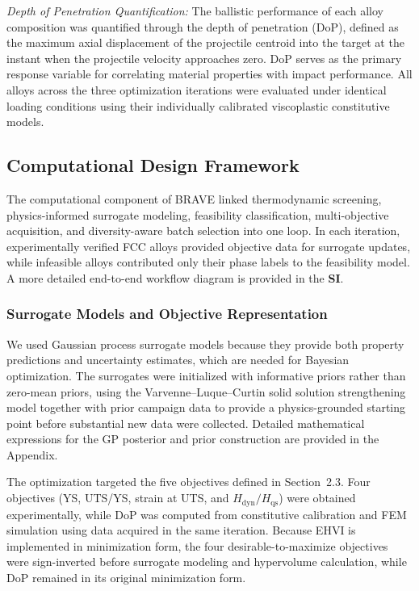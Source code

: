 \documentclass[preprint,12pt,times]{elsarticle}  %
\begin{document}
\emph{Depth of Penetration Quantification:} The ballistic performance of each alloy composition was quantified through the depth of penetration (DoP), defined as the maximum axial displacement of the projectile centroid into the target at the instant when the projectile velocity approaches zero. DoP serves as the primary response variable for correlating material properties with impact performance. All alloys across the three optimization iterations were evaluated under identical loading conditions using their individually calibrated viscoplastic constitutive models.


\subsection{Computational Design Framework}

The computational component of BRAVE linked thermodynamic screening, physics-informed surrogate modeling, feasibility classification, multi-objective acquisition, and diversity-aware batch selection into one loop. In each iteration, experimentally verified FCC alloys provided objective data for surrogate updates, while infeasible alloys contributed only their phase labels to the feasibility model. A more detailed end-to-end workflow diagram is provided in the \textbf{SI}.

\subsubsection{Surrogate Models and Objective Representation}

We used Gaussian process surrogate models because they provide both property predictions and uncertainty estimates, which are needed for Bayesian optimization. The surrogates were initialized with informative priors rather than zero-mean priors, using the Varvenne--Luque--Curtin solid solution strengthening model together with prior campaign data to provide a physics-grounded starting point before substantial new data were collected. Detailed mathematical expressions for the GP posterior and prior construction are provided in the Appendix.

The optimization targeted the five objectives defined in Section~2.3. Four objectives (YS, UTS/YS, strain at UTS, and $H_\text{dyn}/H_\text{qs}$) were obtained experimentally, while DoP was computed from constitutive calibration and FEM simulation using data acquired in the same iteration. Because EHVI is implemented in minimization form, the four desirable-to-maximize objectives were sign-inverted before surrogate modeling and hypervolume calculation, while DoP remained in its original minimization form.
\end{document}
